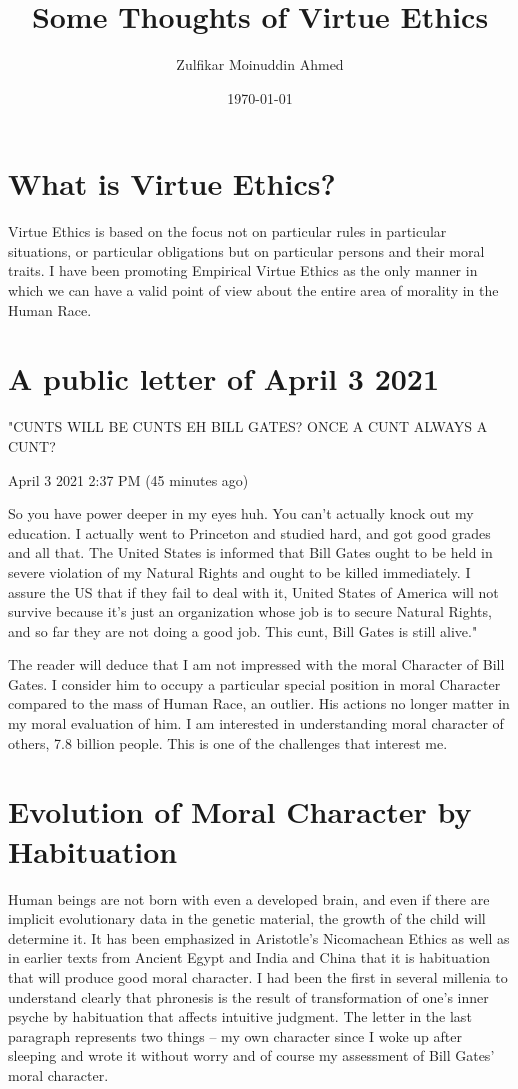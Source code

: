 \documentclass{amsart}
\title{Some Thoughts of Virtue Ethics}
\author{Zulfikar Moinuddin Ahmed}
\date{\today}
\begin{document}
\maketitle

\section{What is Virtue Ethics?}

Virtue Ethics is based on the focus not on particular rules in particular situations, or particular obligations but on particular persons and their moral traits.  I have been promoting Empirical Virtue Ethics as the only manner in which we can have a valid point of view about the entire area of morality in the Human Race.  

\section{A public letter of April 3 2021}

"CUNTS WILL BE CUNTS EH BILL GATES? ONCE A CUNT ALWAYS A CUNT?

April 3 2021 2:37 PM (45 minutes ago)


So you have power deeper in my eyes huh.   You can't actually knock out my education.  I actually went to Princeton and studied hard, and got good grades and all that.  The United States is informed that Bill Gates ought to be held in severe violation of my Natural Rights and ought to be killed immediately.  I assure the US that if they fail to deal with it,  United States of America will not survive because it's just an organization whose job is to secure Natural Rights, and so far they are not doing a good job.  This cunt, Bill Gates is still alive."

The reader will deduce that I am not impressed with the moral Character of Bill Gates.  I consider him to occupy a particular special position in moral Character compared to the mass of Human Race, an outlier.  His actions no longer matter in my moral evaluation of him.  I am interested in understanding moral character of others, 7.8 billion people.  This is one of the challenges that interest me.  

\section{Evolution of Moral Character by Habituation}

Human beings are not born with even a developed brain, and even if there are implicit evolutionary data in the genetic material, the growth of the child will determine it.  It has been emphasized in Aristotle's Nicomachean Ethics as well as in earlier texts from Ancient Egypt and India and China that it is habituation that will produce good moral character.  I had been the first in several millenia to understand clearly that phronesis is the result of transformation of one's inner psyche by habituation that affects intuitive judgment.  The letter in the last paragraph represents two things -- my own character since I woke up after sleeping and wrote it without worry and of course my assessment of Bill Gates' moral character.
\end{document}
